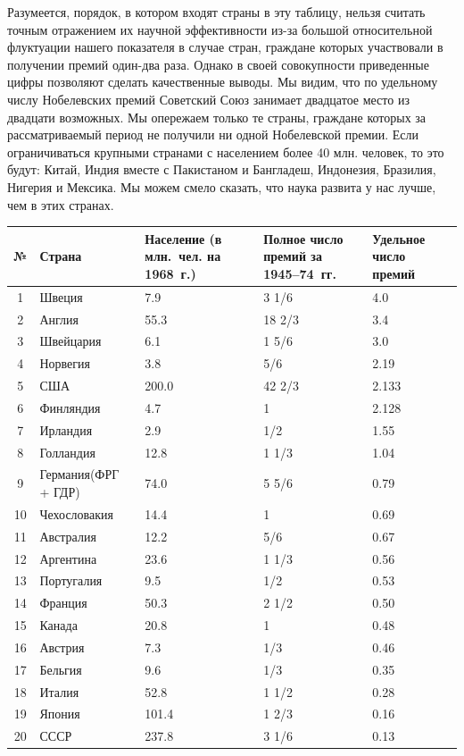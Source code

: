\documentclass{book}
\begin{document}
Разумеется, порядок, в котором входят страны в эту табли­цу, нельзя считать точным отражением их научной эффективности из-за 
большой относительной флуктуации нашего показателя в случае стран, граждане которых участвовали в получении премий один-два 
раза. Однако в своей совокупности приведенные цифры позволяют сделать качественные выводы. Мы видим, что по удельному числу 
Нобелевских премий Советский Союз занимает двадцатое место из двадцати возможных. Мы опережаем только те страны, граждане 
которых за рассматриваемый период не получили ни одной Нобелевской премии. Если ограничиваться крупными странами с населением 
более 40 млн. человек, то это будут: Китай, Индия вместе с Пакистаном и Бангладеш, Индонезия, Бразилия, Нигерия и Мексика. Мы 
можем смело сказать, что наука развита у нас лучше, чем в этих странах.

\begin{center}
\begin{tabular}{ | c | p{2.7cm} | p{3cm} | p{3cm} | p{3cm} | }
\toprule
\textbf{№} & \textbf{Страна} & \textbf{Население (в млн.~чел. на 1968~г.)} & \textbf{Пол\-ное чис\-ло пре\-мий за 1945--74~гг}. & \textbf{Удель\-ное чис\-ло пре\-мий} \\
\toprule
	1  & Швеция 						& 7.9 	& 3 1/6 	& 4.0 	\\ \hline
	2  & Англия 						& 55.3 	& 18 2/3 	& 3.4 	\\ \hline
	3  & Швейцария 						& 6.1 	& 1 5/6 	& 3.0 	\\ \hline
	4  & Норвегия 						& 3.8 	& 5/6 		& 2.19 	\\ \hline
	5  & США 							& 200.0 & 42 2/3 	& 2.133 \\ \hline
	6  & Финляндия 						& 4.7 	& 1 		& 2.128 \\ \hline
	7  & Ирландия 						& 2.9 	& 1/2 		& 1.55 	\\ \hline 
	8  & Голландия 						& 12.8 	& 1 1/3 	& 1.04 	\\ \hline
	9  & Германия\newline{}(ФРГ + ГДР) 	& 74.0 	& 5 5/6 	& 0.79 	\\ \hline
	10 & Чехословакия 					& 14.4 	& 1 		& 0.69 	\\ \hline
	11 & Австралия 						& 12.2 	& 5/6 		& 0.67 	\\ \hline
	12 & Аргентина 						& 23.6 	& 1 1/3 	& 0.56 	\\ \hline 
	13 & Португалия 					& 9.5 	& 1/2 		& 0.53 	\\ \hline 
	14 & Франция 						& 50.3 	& 2 1/2 	& 0.50 	\\ \hline
	15 & Канада 						& 20.8 	& 1 		& 0.48 	\\ \hline
	16 & Австрия 						& 7.3 	& 1/3 		& 0.46 	\\ \hline
	17 & Бельгия 						& 9.6 	& 1/3 		& 0.35 	\\ \hline
	18 & Италия 						& 52.8 	& 1 1/2 	& 0.28 	\\ \hline
	19 & Япония 						& 101.4 & 1 2/3 	& 0.16 	\\ \hline
	20 & СССР							& 237.8 & 3 1/6 	& 0.13 	\\ 
\bottomrule
\end{tabular}\label{tab}
\end{center}
\end{document}
